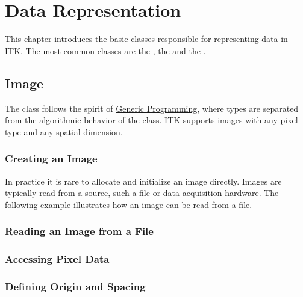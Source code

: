 
\chapter{Data Representation}
\label{sec:DataRepresentation}

This chapter introduces the basic classes responsible
for representing data in ITK. The most common classes are the
, the  and the .

\section{Image}
\label{sec:ImageSection}

The  class follows the spirit of
\href{http://www.boost.org/more/generic_programming.html}{Generic Programming},
where types are separated from the algorithmic behavior of the class.
ITK supports images with any pixel type and any spatial dimension.

\subsection{Creating an Image}\label{sec:CreatingAnImageSection}



In practice it is rare to allocate and initialize an image directly.
Images are typically read from a source, such a file or data acquisition
hardware. The following example illustrates how an image can be read from
a file.


\subsection{Reading an Image from a File}
\label{sec:ReadingImageFromFile}




\subsection{Accessing Pixel Data}
\label{sec:AccessingImagePixelData}




\subsection{Defining Origin and Spacing}
\label{sec:DefiningImageOriginAndSpacing}





